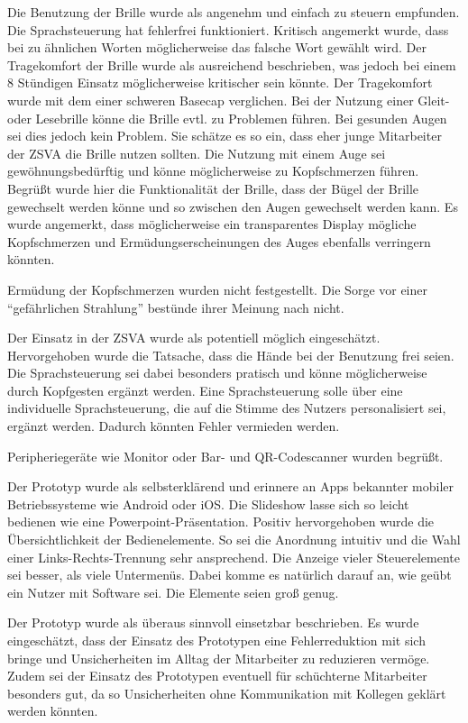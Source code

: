 Die Benutzung der Brille wurde als angenehm und einfach zu steuern empfunden. Die Sprachsteuerung hat fehlerfrei funktioniert. Kritisch angemerkt wurde, dass bei zu ähnlichen Worten möglicherweise das falsche Wort gewählt wird. Der Tragekomfort der Brille wurde als ausreichend beschrieben, was jedoch bei einem 8 Stündigen Einsatz möglicherweise kritischer sein könnte. Der Tragekomfort wurde mit dem einer schweren Basecap verglichen. Bei der Nutzung einer Gleit- oder Lesebrille könne die Brille evtl. zu Problemen führen. Bei gesunden Augen sei dies jedoch kein Problem. Sie schätze es so ein, dass eher junge Mitarbeiter der ZSVA die Brille nutzen sollten. Die Nutzung mit einem Auge sei gewöhnungsbedürftig und könne möglicherweise zu Kopfschmerzen führen. Begrüßt wurde hier die Funktionalität der Brille, dass der Bügel der Brille gewechselt werden könne und so zwischen den Augen gewechselt werden kann. Es wurde angemerkt, dass möglicherweise ein transparentes Display mögliche Kopfschmerzen und Ermüdungserscheinungen des Auges ebenfalls verringern könnten.

Ermüdung der Kopfschmerzen wurden nicht festgestellt. Die Sorge vor einer \enquote{gefährlichen Strahlung} bestünde ihrer Meinung nach nicht.

Der Einsatz in der ZSVA wurde als potentiell möglich eingeschätzt. Hervorgehoben wurde die Tatsache, dass die Hände bei der Benutzung frei seien. Die Sprachsteuerung sei dabei besonders pratisch und könne möglicherweise durch Kopfgesten ergänzt werden. Eine Sprachsteuerung solle über eine individuelle Sprachsteuerung, die auf die Stimme des Nutzers personalisiert sei, ergänzt werden. Dadurch könnten Fehler vermieden werden.

Peripheriegeräte wie Monitor oder Bar- und QR-Codescanner wurden begrüßt.

Der Prototyp wurde als selbsterklärend und erinnere an Apps bekannter mobiler  Betriebssysteme wie Android oder iOS. Die Slideshow lasse sich so leicht bedienen wie eine Powerpoint-Präsentation. Positiv hervorgehoben wurde die Übersichtlichkeit der Bedienelemente. So sei die Anordnung intuitiv und die Wahl einer Links-Rechts-Trennung sehr ansprechend. Die Anzeige vieler Steuerelemente sei besser, als viele Untermenüs. Dabei komme es natürlich darauf an, wie geübt ein Nutzer mit Software sei. Die Elemente seien groß genug. 

Der Prototyp wurde als überaus sinnvoll einsetzbar beschrieben. Es wurde eingeschätzt, dass der Einsatz des Prototypen eine Fehlerreduktion mit sich bringe und Unsicherheiten im Alltag der Mitarbeiter zu reduzieren vermöge. Zudem sei der Einsatz des Prototypen eventuell für schüchterne Mitarbeiter besonders gut, da so Unsicherheiten ohne Kommunikation mit Kollegen geklärt werden könnten.

